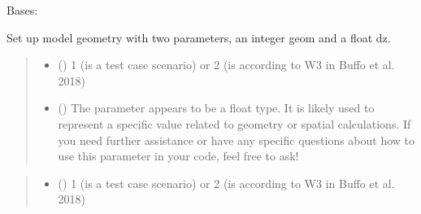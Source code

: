 \documentclass[a4paper,11pt,english,openany]{sphinxmanual}
\begin{document}
\begin{fulllineitems}
\label{\detokenize{api/spyice.preprocess.geometry_settings:spyice.preprocess.geometry_settings.GeometrySettings}}
\pysigstartsignatures
{}
\pysigstopsignatures
\sphinxAtStartPar
Bases: 

\sphinxAtStartPar
Set up model geometry with two parameters, an integer geom and a float dz.
\begin{quote}\begin{description}
\begin{itemize}
\item {} 
\sphinxAtStartPar
{} () \textendash{} 1 (is a test case scenario) or  2 (is according to W3 in Buffo et al. 2018)

\item {} 
\sphinxAtStartPar
{} () \textendash{} The parameter  appears to be a float type. It is likely used to represent a specific value related to geometry or spatial calculations. If you need further assistance or have any specific questions about how to use this parameter in your code, feel free to ask!

\end{itemize}

\end{description}\end{quote}

\begin{fulllineitems}
\label{\detokenize{api/spyice.preprocess.geometry_settings:spyice.preprocess.geometry_settings.GeometrySettings.__init__}}
\pysigstartsignatures
{}
\pysigstopsignatures\begin{quote}\begin{description}
\begin{itemize}
\item {} 
\sphinxAtStartPar
{} () \textendash{} 1 (is a test case scenario) or  2 (is according to W3 in Buffo et al. 2018)


\end{itemize}
\end{description}
\end{quote}
\end{fulllineitems}
\end{fulllineitems}
\end{document}
